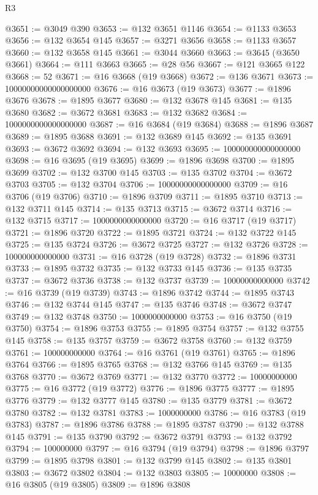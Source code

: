 \begin{lexlean}{R3}
\begin{coremodule}
@3651 := @3049 @390
@3653 := @132 @3651 @1146
@3654 := @1133 @3653
@3656 := @132 @3654 @145
@3657 := @3271 @3656
@3658 := @1133 @3657
@3660 := @132 @3658 @145
@3661 := @3044 @3660
@3663 := @3645 (@3650 @3661)
@3664 := @111 @3663
@3665 := @28 @56
@3667 := @121 @3665 @122
@3668 := 52
@3671 := @16 @3668 (@19 @3668)
@3672 := @136 @3671
@3673 := 10000000000000000000
@3676 := @16 @3673 (@19 @3673)
@3677 := @1896 @3676
@3678 := @1895 @3677
@3680 := @132 @3678 @145
@3681 := @135 @3680
@3682 := @3672 @3681
@3683 := @132 @3682
@3684 := 1000000000000000000
@3687 := @16 @3684 (@19 @3684)
@3688 := @1896 @3687
@3689 := @1895 @3688
@3691 := @132 @3689 @145
@3692 := @135 @3691
@3693 := @3672 @3692
@3694 := @132 @3693
@3695 := 100000000000000000
@3698 := @16 @3695 (@19 @3695)
@3699 := @1896 @3698
@3700 := @1895 @3699
@3702 := @132 @3700 @145
@3703 := @135 @3702
@3704 := @3672 @3703
@3705 := @132 @3704
@3706 := 10000000000000000
@3709 := @16 @3706 (@19 @3706)
@3710 := @1896 @3709
@3711 := @1895 @3710
@3713 := @132 @3711 @145
@3714 := @135 @3713
@3715 := @3672 @3714
@3716 := @132 @3715
@3717 := 1000000000000000
@3720 := @16 @3717 (@19 @3717)
@3721 := @1896 @3720
@3722 := @1895 @3721
@3724 := @132 @3722 @145
@3725 := @135 @3724
@3726 := @3672 @3725
@3727 := @132 @3726
@3728 := 100000000000000
@3731 := @16 @3728 (@19 @3728)
@3732 := @1896 @3731
@3733 := @1895 @3732
@3735 := @132 @3733 @145
@3736 := @135 @3735
@3737 := @3672 @3736
@3738 := @132 @3737
@3739 := 10000000000000
@3742 := @16 @3739 (@19 @3739)
@3743 := @1896 @3742
@3744 := @1895 @3743
@3746 := @132 @3744 @145
@3747 := @135 @3746
@3748 := @3672 @3747
@3749 := @132 @3748
@3750 := 1000000000000
@3753 := @16 @3750 (@19 @3750)
@3754 := @1896 @3753
@3755 := @1895 @3754
@3757 := @132 @3755 @145
@3758 := @135 @3757
@3759 := @3672 @3758
@3760 := @132 @3759
@3761 := 100000000000
@3764 := @16 @3761 (@19 @3761)
@3765 := @1896 @3764
@3766 := @1895 @3765
@3768 := @132 @3766 @145
@3769 := @135 @3768
@3770 := @3672 @3769
@3771 := @132 @3770
@3772 := 10000000000
@3775 := @16 @3772 (@19 @3772)
@3776 := @1896 @3775
@3777 := @1895 @3776
@3779 := @132 @3777 @145
@3780 := @135 @3779
@3781 := @3672 @3780
@3782 := @132 @3781
@3783 := 1000000000
@3786 := @16 @3783 (@19 @3783)
@3787 := @1896 @3786
@3788 := @1895 @3787
@3790 := @132 @3788 @145
@3791 := @135 @3790
@3792 := @3672 @3791
@3793 := @132 @3792
@3794 := 100000000
@3797 := @16 @3794 (@19 @3794)
@3798 := @1896 @3797
@3799 := @1895 @3798
@3801 := @132 @3799 @145
@3802 := @135 @3801
@3803 := @3672 @3802
@3804 := @132 @3803
@3805 := 10000000
@3808 := @16 @3805 (@19 @3805)
@3809 := @1896 @3808

\end{coremodule}
\end{lexlean}
